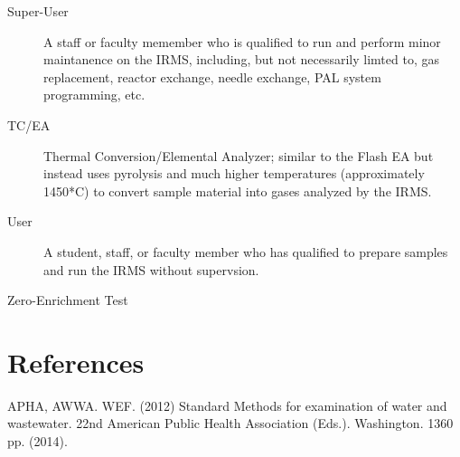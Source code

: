 \documentclass[12pt]{../SOP3}\usepackage[]{graphicx}\usepackage[]{color}
\begin{document}
\begin{description}
\item[Super-User] \label{Super-User} A staff or faculty memember who is qualified to run and perform minor maintanence on the IRMS, including, but not necessarily limted to, gas replacement, reactor exchange, needle exchange, PAL system programming, etc.  

\item[TC/EA] Thermal Conversion/Elemental Analyzer; similar to the Flash EA but instead uses pyrolysis and much higher temperatures (approximately 1450*C) to convert sample material into gases analyzed by the IRMS.

\item[User] A student, staff, or faculty member who has qualified to prepare samples and run the IRMS without supervsion.

\item[Zero-Enrichment Test]

\end{description}


\section{References}

\NP APHA, AWWA. WEF. (2012) Standard Methods for examination of water and wastewater. 22nd American Public Health Association (Eds.). Washington. 1360 pp. (2014).
\end{document}
